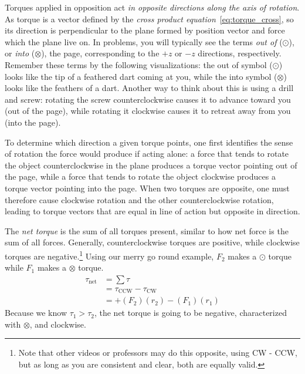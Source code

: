 Torques applied in opposition act \emph{in opposite directions along the axis of rotation}. As torque is a vector defined by the \emph{cross product equation}~\ref{eq:torque_cross}, so its direction is perpendicular to the plane formed by position vector and force which the plane live on. In problems, you will typically see the terms \emph{out of} ($\odot$), or \emph{into} ($\otimes$), the page, corresponding to the $+z$ or $-z$ directions, respectively. Remember these terms by the following visualizations: the out of symbol ($\odot$) looks like the tip of a feathered dart coming at you, while the into symbol ($\otimes$) looks like the feathers of a dart. Another way to think about this is using a drill and screw: rotating the screw counterclockwise causes it to advance toward you (out of the page), while rotating it clockwise causes it to retreat away from you (into the page). 

To determine which direction a given torque points, one first identifies the sense of rotation the force would produce if acting alone: a force that tends to rotate the object counterclockwise in the plane produces a torque vector pointing out of the page, while a force that tends to rotate the object clockwise produces a torque vector pointing into the page. When two torques are opposite, one must therefore cause clockwise rotation and the other counterclockwise rotation, leading to torque vectors that are equal in line of action but opposite in direction. 

The \emph{net torque} is the sum of all torques present, similar to how net force is the sum of all forces. Generally, counterclockwise torques are positive, while clockwise torques are negative.\footnote{Note that other videos or professors may do this opposite, using CW - CCW, but as long as you are consistent and clear, both are equally valid.} Using our merry go round example, $F_2$ makes a $\odot$ torque while $F_1$ makes a $\otimes$ torque.
\begin{align*}
    \tau_{\text{net}} &= \sum \tau \\
    &= \tau_\text{CCW} - \tau_\text{CW} \\
    &=+(F_2)(r_2) - (F_1)(r_1)
\end{align*}
Because we know $\tau_1 > \tau_2$, the net torque is going to be negative, characterized with $\otimes$, and clockwise.

